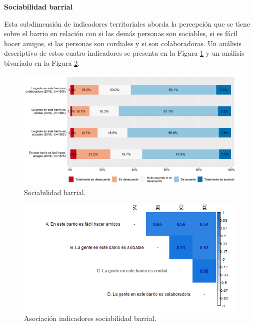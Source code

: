 \documentclass[
  12pt,
]{book}
\begin{document}
\textbf{Sociabilidad barrial}

Esta subdimensión de indicadores territoriales aborda la percepción que se tiene sobre el barrio en relación con si las demás personas son sociables, si es fácil hacer amigos, si las personas son cordiales y si son colaboradoras. Un análisis descriptivo de estos cuatro indicadores se presenta en la Figura \ref{fig:sociabilidad-barrial} y un análisis bivariado en la Figura \ref{fig:sociabilidad-barrial-cor}.

\begin{figure}[H]

{\centering \includegraphics[width=1\linewidth,height=1\textheight]{output/graphs/sociabilidad-barrial} 

}

\caption{Sociabilidad barrial.}\label{fig:sociabilidad-barrial}
\end{figure}

\begin{figure}[H]

{\centering \includegraphics[width=1\linewidth,height=1\textheight]{output/graphs/sociabilidad-barrial_cor} 

}

\caption{Asociación indicadores sociabilidad barrial.}\label{fig:sociabilidad-barrial-cor}
\end{figure}
\end{document}
